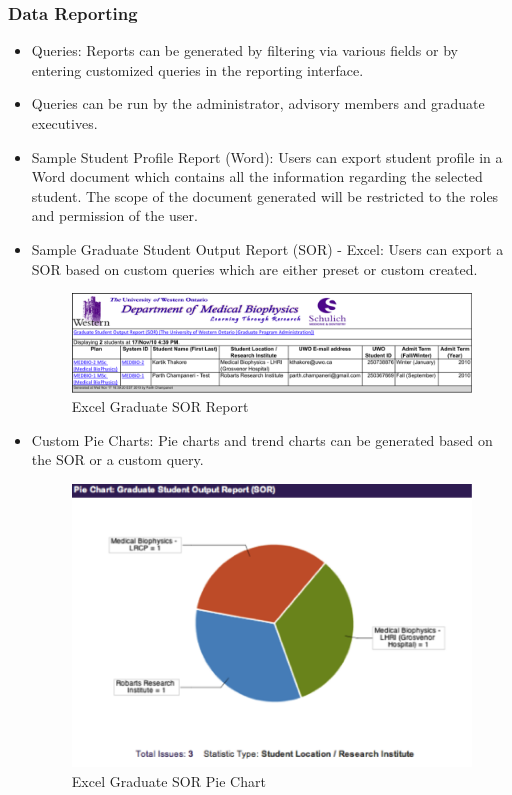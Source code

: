 \documentclass[11pt,a4paper]{report}
\begin{document}
\subsubsection{Data Reporting}
\begin{itemize}
\item Queries: Reports can be generated by filtering via various fields or by entering customized queries in the reporting interface.
\item Queries can be run by the administrator, advisory members and graduate executives.
\item Sample Student Profile Report (Word): Users can export student profile in a Word document which contains all the information regarding the selected student. The scope of the document generated will be restricted to the roles and permission of the user.
\item Sample Graduate Student Output Report (SOR) - Excel: Users can export a SOR based on custom queries which are either preset or custom created.

\begin{figure}[htp]
\centering
\includegraphics[scale=1]{diagrams/HTMLTemplating/SOR_Excel.png}
\caption{Excel Graduate SOR Report}
\label{fig:ExcelSOR}
\end{figure}

\item Custom Pie Charts: Pie charts and trend charts can be generated based on the SOR or a custom query.

\begin{figure}[htp]
\centering
\includegraphics[scale=1]{diagrams/HTMLTemplating/PieChart.png}
\caption{Excel Graduate SOR Pie Chart}
\label{fig:PieSOR}
\end{figure}

\end{itemize}
\end{document}
